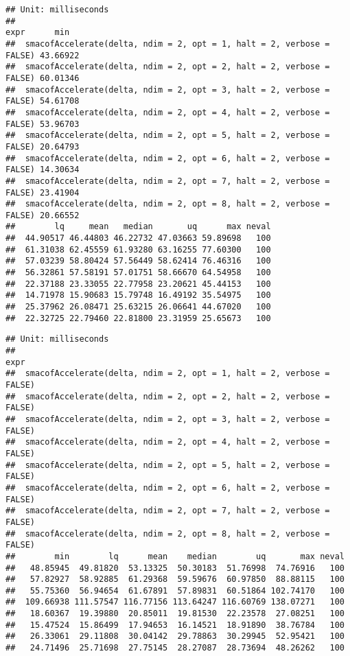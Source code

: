 \documentclass[
  12pt,
]{article}
\begin{document}
\begin{verbatim}
## Unit: milliseconds
##                                                                   expr      min
##  smacofAccelerate(delta, ndim = 2, opt = 1, halt = 2, verbose = FALSE) 43.66922
##  smacofAccelerate(delta, ndim = 2, opt = 2, halt = 2, verbose = FALSE) 60.01346
##  smacofAccelerate(delta, ndim = 2, opt = 3, halt = 2, verbose = FALSE) 54.61708
##  smacofAccelerate(delta, ndim = 2, opt = 4, halt = 2, verbose = FALSE) 53.96703
##  smacofAccelerate(delta, ndim = 2, opt = 5, halt = 2, verbose = FALSE) 20.64793
##  smacofAccelerate(delta, ndim = 2, opt = 6, halt = 2, verbose = FALSE) 14.30634
##  smacofAccelerate(delta, ndim = 2, opt = 7, halt = 2, verbose = FALSE) 23.41904
##  smacofAccelerate(delta, ndim = 2, opt = 8, halt = 2, verbose = FALSE) 20.66552
##        lq     mean   median       uq      max neval
##  44.90517 46.44803 46.22732 47.03663 59.89698   100
##  61.31038 62.45559 61.93280 63.16255 77.60300   100
##  57.03239 58.80424 57.56449 58.62414 76.46316   100
##  56.32861 57.58191 57.01751 58.66670 64.54958   100
##  22.37188 23.33055 22.77958 23.20621 45.44153   100
##  14.71978 15.90683 15.79748 16.49192 35.54975   100
##  25.37962 26.08471 25.63215 26.06641 44.67020   100
##  22.32725 22.79460 22.81800 23.31959 25.65673   100
\end{verbatim}

\begin{verbatim}
## Unit: milliseconds
##                                                                   expr
##  smacofAccelerate(delta, ndim = 2, opt = 1, halt = 2, verbose = FALSE)
##  smacofAccelerate(delta, ndim = 2, opt = 2, halt = 2, verbose = FALSE)
##  smacofAccelerate(delta, ndim = 2, opt = 3, halt = 2, verbose = FALSE)
##  smacofAccelerate(delta, ndim = 2, opt = 4, halt = 2, verbose = FALSE)
##  smacofAccelerate(delta, ndim = 2, opt = 5, halt = 2, verbose = FALSE)
##  smacofAccelerate(delta, ndim = 2, opt = 6, halt = 2, verbose = FALSE)
##  smacofAccelerate(delta, ndim = 2, opt = 7, halt = 2, verbose = FALSE)
##  smacofAccelerate(delta, ndim = 2, opt = 8, halt = 2, verbose = FALSE)
##        min        lq      mean    median        uq       max neval
##   48.85945  49.81820  53.13325  50.30183  51.76998  74.76916   100
##   57.82927  58.92885  61.29368  59.59676  60.97850  88.88115   100
##   55.75360  56.94654  61.67891  57.89831  60.51864 102.74170   100
##  109.66938 111.57547 116.77156 113.64247 116.60769 138.07271   100
##   18.60367  19.39880  20.85011  19.81530  22.23578  27.08251   100
##   15.47524  15.86499  17.94653  16.14521  18.91890  38.76784   100
##   26.33061  29.11808  30.04142  29.78863  30.29945  52.95421   100
##   24.71496  25.71698  27.75145  28.27087  28.73694  48.26262   100
\end{verbatim}
\end{document}
